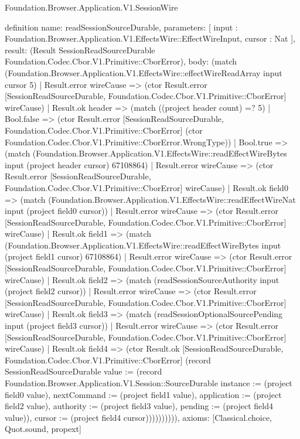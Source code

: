 \begin{lexlean}{Foundation.Browser.Application.V1.SessionWire}
\begin{semanticmodule}
definition{
  name: readSessionSourceDurable,
  parameters: [
    input : Foundation.Browser.Application.V1.EffectsWire::EffectWireInput,
    cursor : Nat
  ],
  result: (Result SessionReadSourceDurable Foundation.Codec.Cbor.V1.Primitive::CborError),
  body: (match (Foundation.Browser.Application.V1.EffectsWire::effectWireReadArray input cursor 5)
    | Result.error wireCause => (ctor Result.error [SessionReadSourceDurable, Foundation.Codec.Cbor.V1.Primitive::CborError] wireCause)
    | Result.ok header => (match ((project header count) =? 5)
      | Bool.false => (ctor Result.error [SessionReadSourceDurable, Foundation.Codec.Cbor.V1.Primitive::CborError] (ctor Foundation.Codec.Cbor.V1.Primitive::CborError.WrongType))
      | Bool.true => (match (Foundation.Browser.Application.V1.EffectsWire::readEffectWireBytes input (project header cursor) 67108864)
        | Result.error wireCause => (ctor Result.error [SessionReadSourceDurable, Foundation.Codec.Cbor.V1.Primitive::CborError] wireCause)
        | Result.ok field0 => (match (Foundation.Browser.Application.V1.EffectsWire::readEffectWireNat input (project field0 cursor))
          | Result.error wireCause => (ctor Result.error [SessionReadSourceDurable, Foundation.Codec.Cbor.V1.Primitive::CborError] wireCause)
          | Result.ok field1 => (match (Foundation.Browser.Application.V1.EffectsWire::readEffectWireBytes input (project field1 cursor) 67108864)
            | Result.error wireCause => (ctor Result.error [SessionReadSourceDurable, Foundation.Codec.Cbor.V1.Primitive::CborError] wireCause)
            | Result.ok field2 => (match (readSessionSourceAuthority input (project field2 cursor))
              | Result.error wireCause => (ctor Result.error [SessionReadSourceDurable, Foundation.Codec.Cbor.V1.Primitive::CborError] wireCause)
              | Result.ok field3 => (match (readSessionOptionalSourcePending input (project field3 cursor))
                | Result.error wireCause => (ctor Result.error [SessionReadSourceDurable, Foundation.Codec.Cbor.V1.Primitive::CborError] wireCause)
                | Result.ok field4 => (ctor Result.ok [SessionReadSourceDurable, Foundation.Codec.Cbor.V1.Primitive::CborError] (record SessionReadSourceDurable {value := (record Foundation.Browser.Application.V1.Session::SourceDurable {instance := (project field0 value), nextCommand := (project field1 value), application := (project field2 value), authority := (project field3 value), pending := (project field4 value)}), cursor := (project field4 cursor)}))))))))),
  axioms: [Classical.choice, Quot.sound, propext]
}


\end{semanticmodule}
\end{lexlean}
